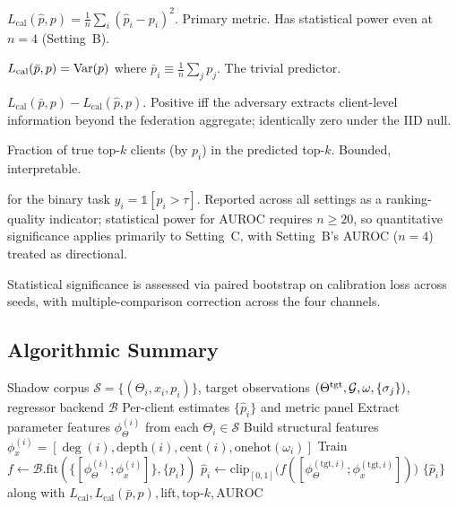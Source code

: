 \begin{description}[itemsep=2pt,leftmargin=*]
\item[Calibration loss] $L_{\text{cal}}(\hat p, p) = \frac{1}{n}\sum_i (\hat p_i - p_i)^2$.
  Primary metric. Has statistical power even at $n=4$ (Setting~B).
\item[Constant-mean baseline]
  $L_{\text{cal}}(\bar p, p) = \mathrm{Var}(p)$ where
  $\bar p_i \equiv \frac{1}{n}\sum_j p_j$. The trivial predictor.
\item[Attack lift]
  $L_{\text{cal}}(\bar p, p) - L_{\text{cal}}(\hat p, p)$.
  Positive iff the adversary extracts client-level information beyond
  the federation aggregate; identically zero under the IID null.
\item[Top-$k$ recovery] Fraction of true top-$k$ clients (by
  $p_i$) in the predicted top-$k$. Bounded, interpretable.
\item[AUROC] for the binary task
  $y_i = \mathbb{1}[p_i > \tau]$. Reported across all settings as a
  ranking-quality indicator; statistical power for AUROC requires
  $n \geq 20$, so quantitative significance applies primarily to
  Setting~C, with Setting~B's AUROC ($n=4$) treated as directional.
\end{description}

Statistical significance is assessed via paired bootstrap on calibration
loss across seeds, with multiple-comparison correction across the four
channels.

\subsection{Algorithmic Summary}
\label{sec:attack-algo}

\begin{algorithm}[t]
\caption{\TADI{}, full-channel variant ($\Adv_2^{\text{full}}$)}
\label{alg:tadi}
\begin{algorithmic}[1]
\Require Shadow corpus $\mathcal{S} = \{(\Theta_i, x_i, p_i)\}$,
         target observations $(\Theta^{\text{tgt}}, \mathcal{G}, \omega, \{\sigma_j\})$,
         regressor backend $\mathcal{B}$
\Ensure  Per-client estimates $\{\hat p_i\}$ and metric panel
\State Extract parameter features $\phi_{\Theta}^{(i)}$ from
       each $\Theta_i \in \mathcal{S}$
\State Build structural features $\phi_x^{(i)} = [\deg(i), \mathrm{depth}(i), \mathrm{cent}(i), \mathrm{onehot}(\omega_i)]$
\State Train $f \gets \mathcal{B}.\mathrm{fit}(
       \{[\phi_{\Theta}^{(i)}; \phi_x^{(i)}]\}, \{p_i\})$
  \State $\hat p_i \gets \mathrm{clip}_{[0,1]}\big( f([\phi_{\Theta}^{(\text{tgt},i)}; \phi_x^{(\text{tgt},i)}]) \big)$
\EndFor
\State \Return $\{\hat p_i\}$ along with $L_{\text{cal}}, L_{\text{cal}}(\bar p,p),
       \text{lift}, \mathrm{top}\text{-}k, \mathrm{AUROC}$
\end{algorithmic}
\end{algorithm}

